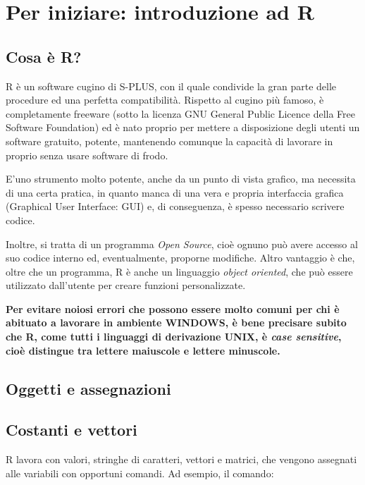 \documentclass[a4paper,12pt,oneside]{book}
\begin{document}
\chapter{Per iniziare: introduzione ad
R}\label{per-iniziare-introduzione-ad-r}

\section{Cosa è R?}\label{cosa-e-r}

R è un software cugino di S-PLUS, con il quale condivide la gran parte
delle procedure ed una perfetta compatibilità. Rispetto al cugino più
famoso, è completamente freeware (sotto la licenza GNU General Public
Licence della Free Software Foundation) ed è nato proprio per mettere a
disposizione degli utenti un software gratuito, potente, mantenendo
comunque la capacità di lavorare in proprio senza usare software di
frodo.

E'uno strumento molto potente, anche da un punto di vista grafico, ma
necessita di una certa pratica, in quanto manca di una vera e propria
interfaccia grafica (Graphical User Interface: GUI) e, di conseguenza, è
spesso necessario scrivere codice.

Inoltre, si tratta di un programma \emph{Open Source}, cioè ognuno può
avere accesso al suo codice interno ed, eventualmente, proporne
modifiche. Altro vantaggio è che, oltre che un programma, R è anche un
linguaggio \emph{object oriented}, che può essere utilizzato dall'utente
per creare funzioni personalizzate.

\textbf{Per evitare noiosi errori che possono essere molto comuni per
chi è abituato a lavorare in ambiente WINDOWS, è bene precisare subito
che R, come tutti i linguaggi di derivazione UNIX, è \emph{case
sensitive}, cioè distingue tra lettere maiuscole e lettere minuscole.}

\section{Oggetti e assegnazioni}\label{oggetti-e-assegnazioni}

\section{Costanti e vettori}\label{costanti-e-vettori}

R lavora con valori, stringhe di caratteri, vettori e matrici, che
vengono assegnati alle variabili con opportuni comandi. Ad esempio, il
comando:
\end{document}
